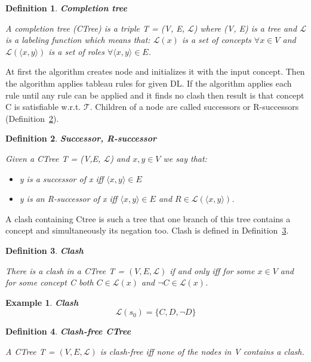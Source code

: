 \documentclass[12pt,a4paper]{article}
\newtheorem{definition}{Definition}[subsection]
\newtheorem{example}{Example}[subsection]
\begin{document}
\begin{definition}{\textbf{Completion tree}}
	\label{def:ctree}

	A completion tree (CTree) is a triple T = (V, E, $\mathcal{L}$) where (V, E)
	is a tree and $\mathcal{L}$ is a labeling function which means that:
	$\mathcal{L}(x)$ is a set of concepts $\forall x \in V$ and
	$\mathcal{L}(\langle x, y \rangle )$ is a set of roles $\forall \langle x, y \rangle \in E$.	
\end{definition}

At first the algorithm creates node and initializes it with the input concept.
Then the algorithm applies tableau rules for given DL. If the algorithm applies each rule until any rule can be applied and it finds no clash then result is that concept C is satisfiable w.r.t. $\mathcal{T}$. Children of a node are called successors or R-successors (Definition~\ref{def:successor}).

\begin{definition}{\textbf{Successor, R-successor}}
	\label{def:successor}

	Given a CTree T = (V,E, $\mathcal{L}$) and $x,y \in V$ we say that: 
	\begin{itemize}
		\item y is a successor of x iff $\langle x,y \rangle \in E$
		\item y is an R-successor of x iff $\langle x,y \rangle \in E$ and $R \in \mathcal{L}(\langle x,y \rangle)$.
	\end{itemize}
\end{definition}

A clash containing Ctree is such a tree that one branch of this tree contains a concept and simultaneously its negation too. Clash is defined in Definition~\ref{def:clash}.

\begin{definition}{\textbf{Clash}}
	\label{def:clash}

	There is a clash in a CTree T = $(V,E, \mathcal{L})$ if and only iff for some $x \in V$ and for some concept C both $C \in \mathcal{L}(x)$ and $\neg C \in \mathcal{L}(x)$.
\end{definition}

\begin{example}{\textbf{Clash}}
	\[ \mathcal{L}(s_{0}) = \{ C, D, \neg D \} \]
\end{example}

\begin{definition}{\textbf{Clash-free CTree}}

A CTree T = $(V,E, \mathcal{L})$ is clash-free iff none of the nodes in V contains a clash.
\end{definition}
\end{document}
